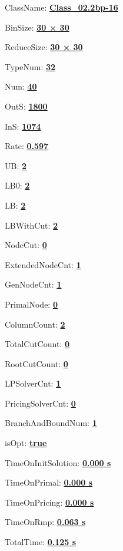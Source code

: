 \documentclass[11pt]{article}
\begin{document}
\pagestyle{empty}


ClassName: \underline{\textbf{Class_02.2bp-16}}
\par
BinSize: \underline{\textbf{30 × 30}}
\par
ReduceSize: \underline{\textbf{30 × 30}}
\par
TypeNum: \underline{\textbf{32}}
\par
Num: \underline{\textbf{40}}
\par
OutS: \underline{\textbf{1800}}
\par
InS: \underline{\textbf{1074}}
\par
Rate: \underline{\textbf{0.597}}
\par
UB: \underline{\textbf{2}}
\par
LB0: \underline{\textbf{2}}
\par
LB: \underline{\textbf{2}}
\par
LBWithCut: \underline{\textbf{2}}
\par
NodeCut: \underline{\textbf{0}}
\par
ExtendedNodeCnt: \underline{\textbf{1}}
\par
GenNodeCnt: \underline{\textbf{1}}
\par
PrimalNode: \underline{\textbf{0}}
\par
ColumnCount: \underline{\textbf{2}}
\par
TotalCutCount: \underline{\textbf{0}}
\par
RootCutCount: \underline{\textbf{0}}
\par
LPSolverCnt: \underline{\textbf{1}}
\par
PricingSolverCnt: \underline{\textbf{0}}
\par
BranchAndBoundNum: \underline{\textbf{1}}
\par
isOpt: \underline{\textbf{true}}
\par
TimeOnInitSolution: \underline{\textbf{0.000 s}}
\par
TimeOnPrimal: \underline{\textbf{0.000 s}}
\par
TimeOnPricing: \underline{\textbf{0.000 s}}
\par
TimeOnRmp: \underline{\textbf{0.063 s}}
\par
TotalTime: \underline{\textbf{0.125 s}}
\par
\newpage
\end{document}
